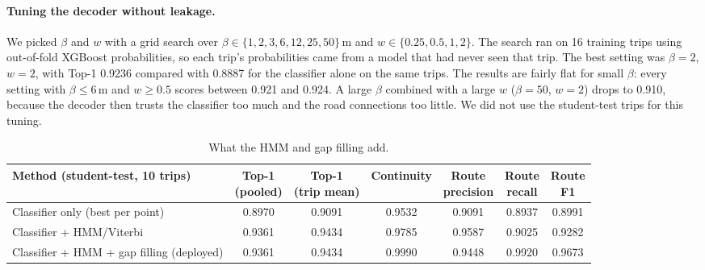 \documentclass[11pt,a4paper]{article}
\begin{document}
\paragraph{Tuning the decoder without leakage.}
We picked $\beta$ and $w$ with a grid search over $\beta \in \{1, 2, 3, 6, 12, 25, 50\}$\,m and
$w \in \{0.25, 0.5, 1, 2\}$. The search ran on 16 training trips using out-of-fold XGBoost probabilities, so
each trip's probabilities came from a model that had never seen that trip. The best setting was $\beta = 2$,
$w = 2$, with Top-1 0.9236 compared with 0.8887 for the classifier alone on the same trips. The results are
fairly flat for small $\beta$: every setting with $\beta \le 6$\,m and $w \ge 0.5$ scores between 0.921 and
0.924. A large $\beta$ combined with a large $w$ ($\beta = 50$, $w = 2$) drops to 0.910, because the decoder
then trusts the classifier too much and the road connections too little. We did not use the student-test
trips for this tuning.

\begin{table}[H]
\centering
\small
\begin{tabular}{@{}lcccccc@{}}
\toprule
\textbf{Method (student-test, 10 trips)} & \makecell{\textbf{Top-1}\\\textbf{(pooled)}} & \makecell{\textbf{Top-1}\\\textbf{(trip mean)}} &
\textbf{Continuity} & \makecell{\textbf{Route}\\\textbf{precision}} & \makecell{\textbf{Route}\\\textbf{recall}} & \makecell{\textbf{Route}\\\textbf{F1}} \\
\midrule
Classifier only (best per point) & 0.8970 & 0.9091 & 0.9532 & 0.9091 & 0.8937 & 0.8991 \\
Classifier + HMM/Viterbi & 0.9361 & 0.9434 & 0.9785 & 0.9587 & 0.9025 & 0.9282 \\
\rowcolor{pick}
Classifier + HMM + gap filling (deployed) & 0.9361 & 0.9434 & 0.9990 & 0.9448 & 0.9920 & 0.9673 \\
\bottomrule
\end{tabular}
\caption{What the HMM and gap filling add.}
\end{table}
\end{document}
